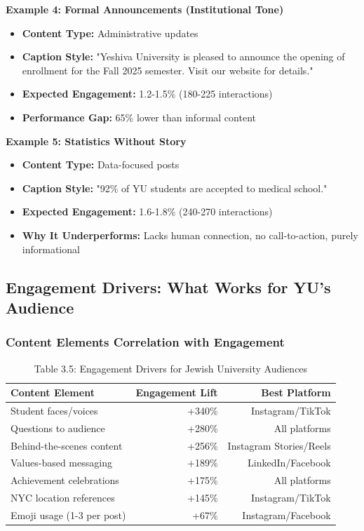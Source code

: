 \documentclass[12pt]{report}
\begin{document}
\textbf{Example 4: Formal Announcements (Institutional Tone)}
\begin{itemize}
    \item \textbf{Content Type:} Administrative updates
    \item \textbf{Caption Style:} "Yeshiva University is pleased to announce the opening of enrollment for the Fall 2025 semester. Visit our website for details."
    \item \textbf{Expected Engagement:} 1.2-1.5\% (180-225 interactions)
    \item \textbf{Performance Gap:} 65\% lower than informal content
\end{itemize}

\textbf{Example 5: Statistics Without Story}
\begin{itemize}
    \item \textbf{Content Type:} Data-focused posts
    \item \textbf{Caption Style:} "92\% of YU students are accepted to medical school."
    \item \textbf{Expected Engagement:} 1.6-1.8\% (240-270 interactions)
    \item \textbf{Why It Underperforms:} Lacks human connection, no call-to-action, purely informational
\end{itemize}

\subsection{Engagement Drivers: What Works for YU's Audience}

\subsubsection{Content Elements Correlation with Engagement}

\begin{table}[h]
\caption{Table 3.5: Engagement Drivers for Jewish University Audiences}
\begin{tabular}{@{}lrr@{}}
\toprule
\textbf{Content Element} & \textbf{Engagement Lift} & \textbf{Best Platform} \\
\midrule
Student faces/voices & +340\% & Instagram/TikTok \\
Questions to audience & +280\% & All platforms \\
Behind-the-scenes content & +256\% & Instagram Stories/Reels \\
Values-based messaging & +189\% & LinkedIn/Facebook \\
Achievement celebrations & +175\% & All platforms \\
NYC location references & +145\% & Instagram/TikTok \\
Emoji usage (1-3 per post) & +67\% & Instagram/Facebook \\
\bottomrule
\end{tabular}
\end{table}
\end{document}
